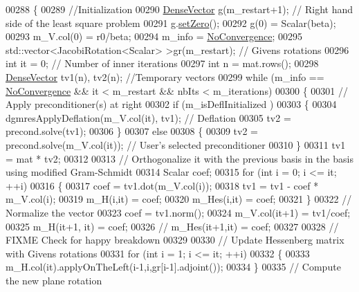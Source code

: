 \begin{DoxyCode}
00288 \textcolor{keyword}{}\{
00289   \textcolor{comment}{//Initialization }
00290   \hyperlink{group___core___module}{DenseVector} g(m\_restart+1); \textcolor{comment}{// Right hand side of the least square problem}
00291   g.\hyperlink{class_eigen_1_1_plain_object_base_ac21ad5f989f320e46958b75ac8d9a1da}{setZero}();  
00292   g(0) = Scalar(beta); 
00293   m\_V.col(0) = r0/beta; 
00294   m\_info = \hyperlink{group__enums_gga85fad7b87587764e5cf6b513a9e0ee5eaba1c8763d1179778070f365ecc4157a8}{NoConvergence}; 
00295   std::vector<JacobiRotation<Scalar> >gr(m\_restart); \textcolor{comment}{// Givens rotations}
00296   \textcolor{keywordtype}{int} it = 0; \textcolor{comment}{// Number of inner iterations }
00297   \textcolor{keywordtype}{int} n = mat.rows();
00298   \hyperlink{group___core___module}{DenseVector} tv1(n), tv2(n);  \textcolor{comment}{//Temporary vectors}
00299   \textcolor{keywordflow}{while} (m\_info == \hyperlink{group__enums_gga85fad7b87587764e5cf6b513a9e0ee5eaba1c8763d1179778070f365ecc4157a8}{NoConvergence} && it < m\_restart && nbIts < m\_iterations)
00300   \{    
00301     \textcolor{comment}{// Apply preconditioner(s) at right}
00302     \textcolor{keywordflow}{if} (m\_isDeflInitialized )
00303     \{
00304       dgmresApplyDeflation(m\_V.col(it), tv1); \textcolor{comment}{// Deflation}
00305       tv2 = precond.solve(tv1); 
00306     \}
00307     \textcolor{keywordflow}{else}
00308     \{
00309       tv2 = precond.solve(m\_V.col(it)); \textcolor{comment}{// User's selected preconditioner}
00310     \}
00311     tv1 = mat * tv2; 
00312    
00313     \textcolor{comment}{// Orthogonalize it with the previous basis in the basis using modified Gram-Schmidt}
00314     Scalar coef; 
00315     \textcolor{keywordflow}{for} (\textcolor{keywordtype}{int} i = 0; i <= it; ++i)
00316     \{ 
00317       coef = tv1.dot(m\_V.col(i));
00318       tv1 = tv1 - coef * m\_V.col(i); 
00319       m\_H(i,it) = coef; 
00320       m\_Hes(i,it) = coef; 
00321     \}
00322     \textcolor{comment}{// Normalize the vector }
00323     coef = tv1.norm(); 
00324     m\_V.col(it+1) = tv1/coef;
00325     m\_H(it+1, it) = coef;
00326 \textcolor{comment}{//     m\_Hes(it+1,it) = coef; }
00327     
00328     \textcolor{comment}{// FIXME Check for happy breakdown }
00329     
00330     \textcolor{comment}{// Update Hessenberg matrix with Givens rotations}
00331     \textcolor{keywordflow}{for} (\textcolor{keywordtype}{int} i = 1; i <= it; ++i) 
00332     \{
00333       m\_H.col(it).applyOnTheLeft(i-1,i,gr[i-1].adjoint());
00334     \}
00335     \textcolor{comment}{// Compute the new plane rotation }

\end{DoxyCode}
